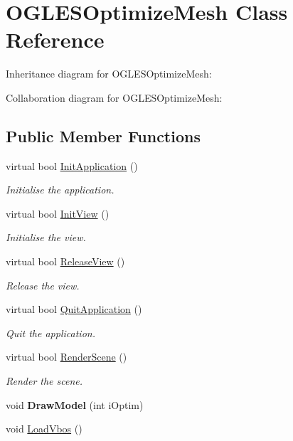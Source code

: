 \hypertarget{class_o_g_l_e_s_optimize_mesh}{\section{O\+G\+L\+E\+S\+Optimize\+Mesh Class Reference}
\label{class_o_g_l_e_s_optimize_mesh}
}


Inheritance diagram for O\+G\+L\+E\+S\+Optimize\+Mesh\+:


Collaboration diagram for O\+G\+L\+E\+S\+Optimize\+Mesh\+:
\subsection*{Public Member Functions}
\begin{DoxyCompactItemize}
\item 
virtual bool \hyperlink{class_o_g_l_e_s_optimize_mesh_a5b05cadd58fa2c399f4735efc498c7fc}{Init\+Application} ()
\begin{DoxyCompactList}\small\item\em Initialise the application. \end{DoxyCompactList}\item 
virtual bool \hyperlink{class_o_g_l_e_s_optimize_mesh_a0c430017d937f617b28981488177f51f}{Init\+View} ()
\begin{DoxyCompactList}\small\item\em Initialise the view. \end{DoxyCompactList}\item 
virtual bool \hyperlink{class_o_g_l_e_s_optimize_mesh_a8e11915b8961ed3021638e52ce74ff72}{Release\+View} ()
\begin{DoxyCompactList}\small\item\em Release the view. \end{DoxyCompactList}\item 
virtual bool \hyperlink{class_o_g_l_e_s_optimize_mesh_a6598e38ed34e6bbc019e752bf7a70d22}{Quit\+Application} ()
\begin{DoxyCompactList}\small\item\em Quit the application. \end{DoxyCompactList}\item 
virtual bool \hyperlink{class_o_g_l_e_s_optimize_mesh_a6bb2fea42f6b292a9fe132927dd3e104}{Render\+Scene} ()
\begin{DoxyCompactList}\small\item\em Render the scene. \end{DoxyCompactList}\item 
\hypertarget{class_o_g_l_e_s_optimize_mesh_aaf4b389635cb853ef896501771958cb4}{void {\bfseries Draw\+Model} (int i\+Optim)}\label{class_o_g_l_e_s_optimize_mesh_aaf4b389635cb853ef896501771958cb4}

\item 
void \hyperlink{class_o_g_l_e_s_optimize_mesh_a4e94c23015e6eb7fda0f994ad23929d9}{Load\+Vbos} ()
\end{DoxyCompactItemize}


